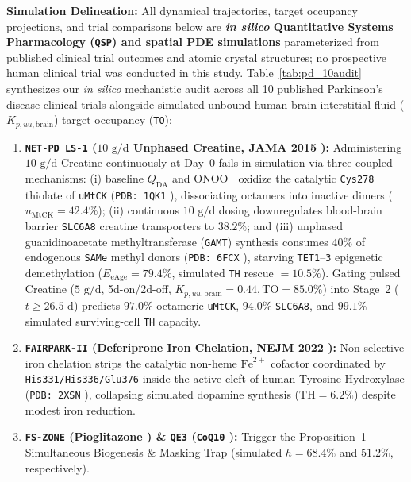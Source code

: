 \documentclass[11pt]{article}
\theoremstyle{plain}
\begin{document}
\noindent\textbf{Simulation Delineation:} All dynamical trajectories, target occupancy projections, and trial comparisons below are \textbf{\textit{in silico} Quantitative Systems Pharmacology (\texttt{QSP}) and spatial PDE simulations} parameterized from published clinical trial outcomes \cite{qe32014coq10,netpd2015creatine,surepd32021inosine,steadypd2020isradipine,devos2022fairpark,fszone2015pioglitazone,brakedal2022nadpark,mullin2020ambroxol,payne2023udca,meissner2024lixipark} and atomic crystal structures; no prospective human clinical trial was conducted in this study. Table~\ref{tab:pd_10audit} synthesizes our \textit{in silico} mechanistic audit across all 10 published Parkinson's disease clinical trials alongside simulated unbound human brain interstitial fluid ($K_{p,uu,\mathrm{brain}}$) target occupancy (\texttt{TO}):
\begin{enumerate}
  \item \textbf{\texttt{NET-PD LS-1} ($10\text{ g/d}$ Unphased Creatine, JAMA 2015 \cite{netpd2015creatine}):} Administering $10\text{ g/d}$ Creatine continuously at Day~0 fails in simulation via three coupled mechanisms: (i) baseline $Q_{\mathrm{DA}}$ and $\mathrm{ONOO}^-$ oxidize the catalytic \texttt{Cys278} thiolate of \texttt{uMtCK} (\texttt{PDB: 1QK1} \cite{eder2000umtck}), dissociating octamers into inactive dimers ($u_{\mathrm{MtCK}} = 42.4\%$); (ii) continuous $10\text{ g/d}$ dosing downregulates blood-brain barrier \texttt{SLC6A8} creatine transporters to $38.2\%$; and (iii) unphased guanidinoacetate methyltransferase (\texttt{GAMT}) synthesis consumes $40\%$ of endogenous \texttt{SAMe} methyl donors \cite{stead2006methyl} (\texttt{PDB: 6FCX} \cite{froese2018mthfr}), starving \texttt{TET1}--\texttt{3} epigenetic demethylation ($E_{\mathrm{eAge}} = 79.4\%$, simulated \texttt{TH} rescue $= 10.5\%$). Gating pulsed Creatine ($5\text{ g/d}$, 5d-on/2d-off, $K_{p,uu,\mathrm{brain}}=0.44, \mathrm{TO}=85.0\%$) into Stage~2 ($t \ge 26.5\text{ d}$) predicts $97.0\%$ octameric \texttt{uMtCK}, $94.0\%$ \texttt{SLC6A8}, and $99.1\%$ simulated surviving-cell \texttt{TH} capacity.
  \item \textbf{\texttt{FAIRPARK-II} (Deferiprone Iron Chelation, NEJM 2022 \cite{devos2022fairpark}):} Non-selective iron chelation strips the catalytic non-heme $\mathrm{Fe}^{2+}$ cofactor coordinated by \texttt{His331/His336/Glu376} inside the active cleft of human Tyrosine Hydroxylase (\texttt{PDB: 2XSN} \cite{muniz2011th}), collapsing simulated dopamine synthesis ($\mathrm{TH} = 6.2\%$) despite modest iron reduction.
  \item \textbf{\texttt{FS-ZONE} (Pioglitazone \cite{fszone2015pioglitazone}) \& \texttt{QE3} (\texttt{CoQ10} \cite{qe32014coq10}):} Trigger the Proposition~1 Simultaneous Biogenesis \& Masking Trap (simulated $h = 68.4\%$ and $51.2\%$, respectively).

\end{enumerate}
\end{document}
